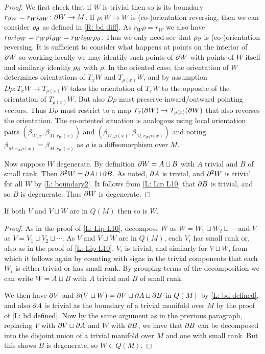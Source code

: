 \begin{proof}
	We first check that if $W$ is trivial then so is its boundary $r_{\partial W} = r_Wi_{\partial W} \colon \partial W \to M$.
	If $\rho \colon W \to W$ is (co-)orientation reversing, then we can consider $\rho_\partial$ as defined in \cref{R: bd diff}.
	As $r_W\rho = r_W$ we also have $r_Wi_{\partial W} = r_W\rho i_{\partial W} = r_W i_{\partial W} \rho_\partial$.
	Thus we only need see that $\rho_\partial$ is (co-)orientation reversing.
	It is sufficient to consider what happens at points on the interior of $\partial W$ so working locally we may identify such points of $\partial W$ with points of $W$ itself and similarly identify $\rho_\partial$ with $\rho$.
	In the oriented case, the orientation of $W$ determines orientations of $T_xW$ and $T_{\rho(x)}W$, and by assumption $D\rho: T_xW \to T_{\rho(x)}W$ takes the orientation of $T_xW$ to the opposite of the orientation of $T_{\rho(x)}W$.
	But also $D\rho$ must preserve inward/outward pointing vectors.
	Thus $D\rho$ must restrict to a map $T_x (\partial W) \to T_{\rho(x)}(\partial W)$ that also reverses the orientation.
	The co-oriented situation is analogous using local orientation pairs $\left(\beta_{W,x}, \beta_{M,r_W(x)}\right)$ and $\left(\beta_{W,\rho(x)}, \beta_{M,r_W\rho(x)}\right)$ and noting $\beta_{M,r_W\rho(x)} = \beta_{M,r_W(x)}$ as $\rho$ is a diffeomorphism over $M$.

	Now suppose $W$ degenerate.
	By definition $\partial W = A \sqcup B$ with $A$ trivial and $B$ of small rank.
	Then $\partial^2 W = \partial A \sqcup \partial B$.
	As noted, $\partial A$ is trivial, and $\partial^2 W$ is trivial for all $W$ by \cref{L: boundary2}.
	It follows from \cref{L: Lip L10} that $\partial B$ is trivial, and so $B$ is degenerate.
	Thus $\partial W$ is degenerate.
\end{proof}

\begin{lemma}\label{L: Lipy12}
	If both $V$ and $V \sqcup W$ are in $Q(M)$ then so is $W$.
\end{lemma}

\begin{proof}
	As in the proof of \cref{L: Lip L10}, decompose $W$ as $W = W_1 \sqcup W_2 \sqcup \cdots$ and $V$ as $V = V_1 \sqcup V_2 \sqcup \cdots$.
	As $V$ and $V \sqcup W$ are in $Q(M)$, each $V_i$ has small rank or, also as in the proof of \cref{L: Lip L10}, $V_i$ is trivial, and similarly for $V \sqcup W$, from which it follows again by counting with signs in the trivial components that each $W_i$ is either trivial or has small rank.
	By grouping terms of the decomposition we can write $W = A \sqcup B$ with $A$ trivial and $B$ of small rank.

	We then have $\partial V$ and $\partial (V \sqcup W) = \partial V \sqcup \partial A \sqcup \partial B$ in $Q(M)$ by \cref{L: bd defined}, and also $\partial A$ is trivial as the boundary of a trivial manifold over $M$ by the proof of \cref{L: bd defined}.
	Now by the same argument as in the previous paragraph, replacing $V$ with $\partial V \sqcup \partial A$ and $W$ with $\partial B$, we have that $\partial B$ can be decomposed into the disjoint union of a trivial manifold over $M$ and one with small rank.
	But this shows $B$ is degenerate, so $W \in Q(M)$.
\end{proof}

